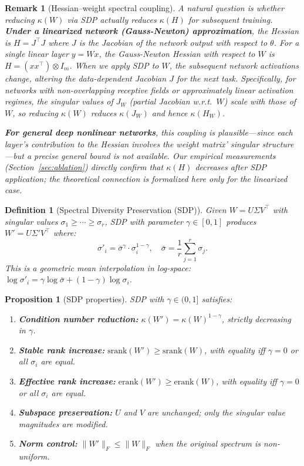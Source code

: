 \documentclass{article}
\newtheorem{proposition}[theorem]{Proposition}
\newtheorem{remark}{Remark}
\newtheorem{definition}{Definition}
\newcommand{\erank}{\mathrm{erank}}
\begin{document}
\begin{remark}[Hessian--weight spectral coupling]
\label{rem:coupling}
A natural question is whether reducing $\kappa(W)$ via SDP actually reduces $\kappa(H)$ for subsequent training. \textbf{Under a linearized network (Gauss-Newton) approximation}, the Hessian is $H = J^\top J$ where $J$ is the Jacobian of the network output with respect to $\theta$. For a single linear layer $y = Wx$, the Gauss-Newton Hessian with respect to $W$ is $H = (x x^\top) \otimes I_m$. When we apply SDP to $W$, the subsequent network activations change, altering the data-dependent Jacobian $J$ for the next task. Specifically, for networks with non-overlapping receptive fields or approximately linear activation regimes, the singular values of $J_W$ (partial Jacobian w.r.t.\ $W$) scale with those of $W$, so reducing $\kappa(W)$ reduces $\kappa(J_W)$ and hence $\kappa(H_W)$.

\textbf{For general deep nonlinear networks}, this coupling is plausible---since each layer's contribution to the Hessian involves the weight matrix' singular structure---but a precise general bound is not available. Our empirical measurements (Section~\ref{sec:ablation}) directly confirm that $\kappa(H)$ decreases after SDP application; the theoretical connection is formalized here only for the linearized case.
\end{remark}

\begin{definition}[Spectral Diversity Preservation (SDP)]
\label{def:sdp}
Given $W = U \Sigma V^\top$ with singular values $\sigma_1 \geq \cdots \geq \sigma_r$, SDP with parameter $\gamma \in [0,1]$ produces $W' = U \Sigma' V^\top$ where:
\[
\sigma'_i = \bar{\sigma}^\gamma \cdot \sigma_i^{1-\gamma}, \quad \bar{\sigma} = \frac{1}{r}\sum_{j=1}^{r} \sigma_j.
\]
This is a geometric mean interpolation in log-space: $\log \sigma'_i = \gamma \log \bar{\sigma} + (1-\gamma) \log \sigma_i$.
\end{definition}

\begin{proposition}[SDP properties]
\label{prop:sdp}
SDP with $\gamma \in (0,1]$ satisfies:
\begin{enumerate}[nosep]
    \item \textbf{Condition number reduction:} $\kappa(W') = \kappa(W)^{1-\gamma}$, strictly decreasing in $\gamma$.
    \item \textbf{Stable rank increase:} $\mathrm{srank}(W') \geq \mathrm{srank}(W)$, with equality iff $\gamma = 0$ or all $\sigma_i$ are equal.
    \item \textbf{Effective rank increase:} $\erank(W') \geq \erank(W)$, with equality iff $\gamma = 0$ or all $\sigma_i$ are equal.
    \item \textbf{Subspace preservation:} $U$ and $V$ are unchanged; only the singular value magnitudes are modified.
    \item \textbf{Norm control:} $\|W'\|_F \leq \|W\|_F$ when the original spectrum is non-uniform.
\end{enumerate}
\end{proposition}
\end{document}
